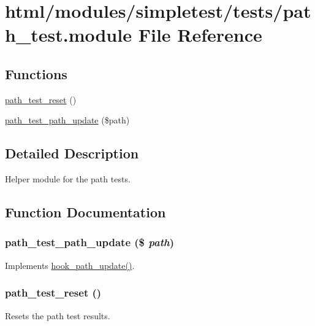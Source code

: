 \hypertarget{path__test_8module}{
\section{html/modules/simpletest/tests/path\_\-test.module File Reference}
\label{path__test_8module}
}
\subsection*{Functions}
\begin{DoxyCompactItemize}
\item 
\hyperlink{path__test_8module_adc5d02fe33769bc888cd5cf06c82cc4c}{path\_\-test\_\-reset} ()
\item 
\hyperlink{path__test_8module_a8dd70fcae6fb36c9624bfa7aff76d261}{path\_\-test\_\-path\_\-update} (\$path)
\end{DoxyCompactItemize}


\subsection{Detailed Description}
Helper module for the path tests. 

\subsection{Function Documentation}
\hypertarget{path__test_8module_a8dd70fcae6fb36c9624bfa7aff76d261}{
\subsubsection[{path\_\-test\_\-path\_\-update}]{\setlength{\rightskip}{0pt plus 5cm}path\_\-test\_\-path\_\-update (\$ {\em path})}}
\label{path__test_8module_a8dd70fcae6fb36c9624bfa7aff76d261}
Implements \hyperlink{group__hooks_ga317c17e152ebb4fc477bb8bfe9294960}{hook\_\-path\_\-update()}. \hypertarget{path__test_8module_adc5d02fe33769bc888cd5cf06c82cc4c}{
\subsubsection[{path\_\-test\_\-reset}]{\setlength{\rightskip}{0pt plus 5cm}path\_\-test\_\-reset ()}}
\label{path__test_8module_adc5d02fe33769bc888cd5cf06c82cc4c}
Resets the path test results. 